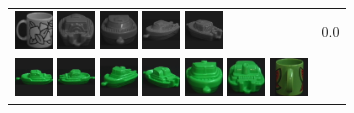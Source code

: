 {\begin{figure}[p]
\begin{tabular}{m{11cm} | m{3cm} |}
\includegraphics[width=1cm]{coil/beeld-49.eps}
\includegraphics[width=1cm]{coil/beeld-29.eps}
\includegraphics[width=1cm]{coil/beeld-26.eps}
\includegraphics[width=1cm]{coil/beeld-27.eps}
\includegraphics[width=1cm]{coil/beeld-28.eps}
& {\scriptsize 0.0}
\\
\includegraphics[width=1cm]{coil/beeld-54.eps}
\includegraphics[width=1cm]{coil/beeld-55.eps}
\includegraphics[width=1cm]{coil/beeld-57.eps}
\includegraphics[width=1cm]{coil/beeld-58.eps}
\includegraphics[width=1cm]{coil/beeld-56.eps}
\includegraphics[width=1cm]{coil/beeld-59.eps}
\includegraphics[width=1cm]{coil/beeld-35.eps}

\end{tabular}
\end{figure}}

